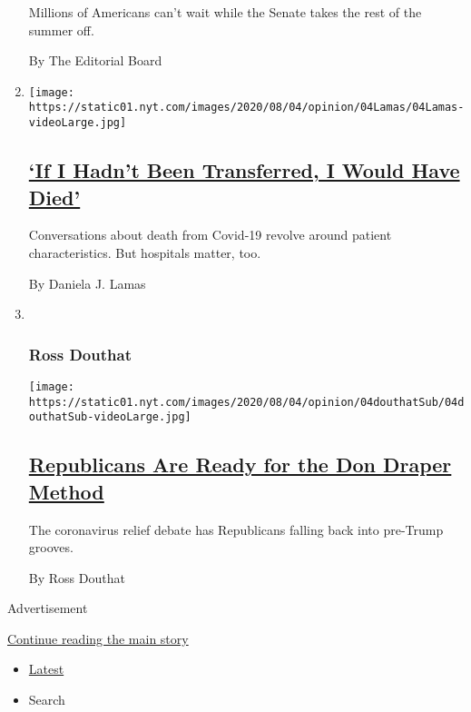 \begin{enumerate}
  Millions of Americans can't wait while the Senate takes the rest of
  the summer off.

  By The Editorial Board
\item
  \texttt{[image: https://static01.nyt.com/images/2020/08/04/opinion/04Lamas/04Lamas-videoLarge.jpg]}

  \hypertarget{if-i-hadnt-been-transferred-i-would-have-died}{%
  \subsection{\texorpdfstring{\href{/2020/08/04/opinion/covid-rural-hospitals.html}{`If
  I Hadn't Been Transferred, I Would Have
  Died'}}{`If I Hadn't Been Transferred, I Would Have Died'}}\label{if-i-hadnt-been-transferred-i-would-have-died}}

  Conversations about death from Covid-19 revolve around patient
  characteristics. But hospitals matter, too.

  By Daniela J. Lamas
\item ~
  \hypertarget{ross-douthat}{%
  \subsubsection{Ross Douthat}\label{ross-douthat}}

  \texttt{[image: https://static01.nyt.com/images/2020/08/04/opinion/04douthatSub/04douthatSub-videoLarge.jpg]}

  \hypertarget{republicans-are-ready-for-the-don-draper-method}{%
  \subsection{\texorpdfstring{\href{/2020/08/04/opinion/trump-republicans-tea-party.html}{Republicans
  Are Ready for the Don Draper
  Method}}{Republicans Are Ready for the Don Draper Method}}\label{republicans-are-ready-for-the-don-draper-method}}

  The coronavirus relief debate has Republicans falling back into
  pre-Trump grooves.

  By Ross Douthat
\end{enumerate}

Advertisement

\protect\hyperlink{after-mid1}{Continue reading the main story}

\begin{itemize}
\tightlist
\item
  \protect\hyperlink{stream-panel}{Latest}
\item
  Search
\end{itemize}


